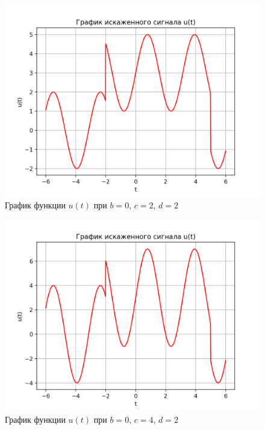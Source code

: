 \begin{figure}[ht!]
    \centering
    \includegraphics[scale=0.75]{media/1 task/specific_freq/Noisy_0_2_2.png}
    \caption{График функции $u(t)$ при $b=0$,  $c=2$,  $d=2$}
    \label{fig:noisy_0_2_2}
\end{figure}

\clearpage

\begin{figure}[ht!]
    \centering
    \includegraphics[scale=0.75]{media/1 task/specific_freq/Noisy_0_4_2.png}
    \caption{График функции $u(t)$ при $b=0$,  $c=4$,  $d=2$}
    \label{fig:noisy_0_4_2}
\end{figure}

